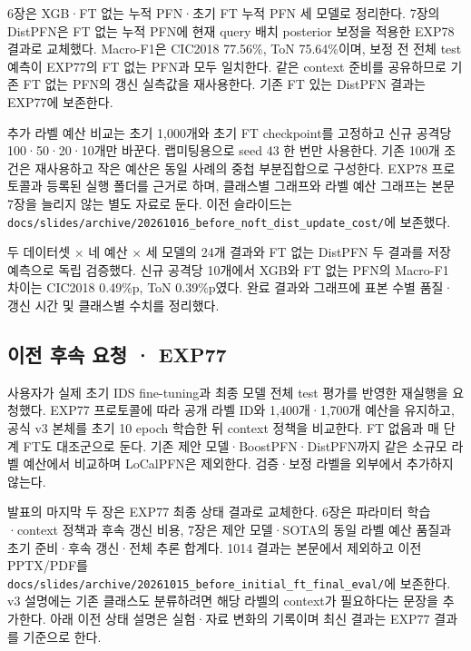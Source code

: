 6장은 XGB·FT 없는 누적 PFN·초기 FT 누적 PFN 세 모델로 정리한다. 7장의 DistPFN은 FT 없는 누적 PFN에 현재 query 배치 posterior 보정을 적용한 EXP78 결과로 교체했다. Macro-F1은 CIC2018 77.56\%, ToN 75.64\%이며, 보정 전 전체 test 예측이 EXP77의 FT 없는 PFN과 모두 일치한다. 같은 context 준비를 공유하므로 기존 FT 없는 PFN의 갱신 실측값을 재사용한다. 기존 FT 있는 DistPFN 결과는 EXP77에 보존한다.

추가 라벨 예산 비교는 초기 1,000개와 초기 FT checkpoint를 고정하고 신규 공격당 100·50·20·10개만 바꾼다. 랩미팅용으로 seed 43 한 번만 사용한다. 기존 100개 조건은 재사용하고 작은 예산은 동일 사례의 중첩 부분집합으로 구성한다. EXP78 프로토콜과 등록된 실행 폴더를 근거로 하며, 클래스별 그래프와 라벨 예산 그래프는 본문 7장을 늘리지 않는 별도 자료로 둔다. 이전 슬라이드는 \texttt{docs/\allowbreak{}\allowbreak{}sli\allowbreak{}des/\allowbreak{}\allowbreak{}arch\allowbreak{}ive/\allowbreak{}\allowbreak{}2026\allowbreak{}1016\_\allowbreak{}\allowbreak{}bef\allowbreak{}ore\_\allowbreak{}\allowbreak{}noft\allowbreak{}\_\allowbreak{}\allowbreak{}dist\_\allowbreak{}\allowbreak{}up\allowbreak{}date\_\allowbreak{}\allowbreak{}cos\allowbreak{}t/\allowbreak{}\allowbreak{}}에 보존했다.

두 데이터셋 × 네 예산 × 세 모델의 24개 결과와 FT 없는 DistPFN 두 결과를 저장 예측으로 독립 검증했다. 신규 공격당 10개에서 XGB와 FT 없는 PFN의 Macro-F1 차이는 CIC2018 0.49\%p, ToN 0.39\%p였다. 완료 결과와 그래프에 표본 수별 품질·갱신 시간 및 클래스별 수치를 정리했다.

\subsection{이전 후속 요청 · EXP77}
사용자가 실제 초기 IDS fine-tuning과 최종 모델 전체 test 평가를 반영한 재실행을 요청했다. EXP77 프로토콜에 따라 공개 라벨 ID와 1,400개·1,700개 예산을 유지하고, 공식 v3 본체를 초기 10 epoch 학습한 뒤 context 정책을 비교한다. FT 없음과 매 단계 FT도 대조군으로 둔다. 기존 제안 모델·BoostPFN·DistPFN까지 같은 소규모 라벨 예산에서 비교하며 LoCalPFN은 제외한다. 검증·보정 라벨을 외부에서 추가하지 않는다.

발표의 마지막 두 장은 EXP77 최종 상태 결과로 교체한다. 6장은 파라미터 학습·context 정책과 후속 갱신 비용, 7장은 제안 모델·SOTA의 동일 라벨 예산 품질과 초기 준비·후속 갱신·전체 추론 합계다. 1014 결과는 본문에서 제외하고 이전 PPTX/\allowbreak{}PDF를 \texttt{docs/\allowbreak{}\allowbreak{}sli\allowbreak{}des/\allowbreak{}\allowbreak{}arch\allowbreak{}ive/\allowbreak{}\allowbreak{}2026\allowbreak{}1015\_\allowbreak{}\allowbreak{}bef\allowbreak{}ore\_\allowbreak{}\allowbreak{}init\allowbreak{}ial\_\allowbreak{}\allowbreak{}ft\_\allowbreak{}\allowbreak{}f\allowbreak{}inal\_\allowbreak{}\allowbreak{}eva\allowbreak{}l/\allowbreak{}\allowbreak{}}에 보존한다. v3 설명에는 기존 클래스도 분류하려면 해당 라벨의 context가 필요하다는 문장을 추가한다. 아래 이전 상태 설명은 실험·자료 변화의 기록이며 최신 결과는 EXP77 결과를 기준으로 한다.

